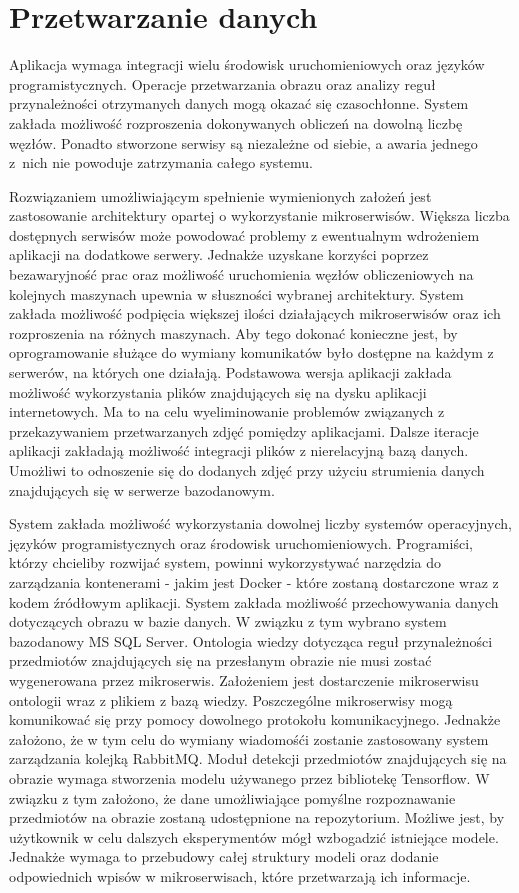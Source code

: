 \section{Przetwarzanie danych}{
Aplikacja wymaga integracji wielu środowisk uruchomieniowych oraz języków programistycznych. Operacje przetwarzania obrazu oraz analizy reguł przynależności otrzymanych danych mogą okazać się czasochłonne. System zakłada możliwość rozproszenia dokonywanych obliczeń na dowolną liczbę węzłów. Ponadto stworzone serwisy są niezależne od siebie, a awaria jednego z~nich nie powoduje zatrzymania całego systemu. 

Rozwiązaniem umożliwiającym spełnienie wymienionych założeń jest zastosowanie architektury opartej o wykorzystanie mikroserwisów. Większa liczba dostępnych serwisów może powodować problemy z ewentualnym wdrożeniem aplikacji na dodatkowe serwery. Jednakże uzyskane korzyści poprzez bezawaryjność prac oraz możliwość uruchomienia węzłów obliczeniowych na kolejnych maszynach upewnia w słuszności wybranej architektury. System zakłada możliwość podpięcia większej ilości działających mikroserwisów oraz ich rozproszenia na różnych maszynach. Aby tego dokonać konieczne jest, by oprogramowanie służące do wymiany komunikatów było dostępne na każdym z serwerów, na których one działają. Podstawowa wersja aplikacji zakłada możliwość wykorzystania plików znajdujących się na dysku aplikacji internetowych. Ma to na celu wyeliminowanie problemów związanych z przekazywaniem przetwarzanych zdjęć pomiędzy aplikacjami. Dalsze iteracje aplikacji zakładają możliwość integracji plików z nierelacyjną bazą danych. Umożliwi to odnoszenie się do dodanych zdjęć przy użyciu strumienia danych znajdujących się w serwerze bazodanowym.

System zakłada możliwość wykorzystania dowolnej liczby systemów operacyjnych, języków programistycznych oraz środowisk uruchomieniowych. Programiści, którzy chcieliby rozwijać system, powinni wykorzystywać narzędzia do zarządzania kontenerami - jakim jest Docker \cite{Docker}- które zostaną dostarczone wraz z kodem źródłowym aplikacji. System zakłada możliwość przechowywania danych dotyczących obrazu w bazie danych. W związku z tym wybrano system bazodanowy MS SQL Server. Ontologia wiedzy dotycząca reguł przynależności przedmiotów znajdujących się na przesłanym obrazie nie musi zostać wygenerowana przez mikroserwis. Założeniem jest dostarczenie mikroserwisu ontologii wraz z plikiem z bazą wiedzy. Poszczególne mikroserwisy mogą komunikować się przy pomocy dowolnego protokołu komunikacyjnego. Jednakże założono, że w tym celu do wymiany wiadomośći zostanie zastosowany system zarządzania kolejką RabbitMQ. Moduł detekcji przedmiotów znajdujących się na obrazie wymaga stworzenia modelu używanego przez bibliotekę Tensorflow. W związku z tym założono, że dane umożliwiające pomyślne rozpoznawanie przedmiotów na obrazie zostaną udostępnione na repozytorium. Możliwe jest, by użytkownik w celu dalszych eksperymentów mógł wzbogadzić istniejące modele. Jednakże wymaga to przebudowy całej struktury modeli oraz dodanie odpowiednich wpisów w mikroserwisach, które przetwarzają ich informacje.
}

